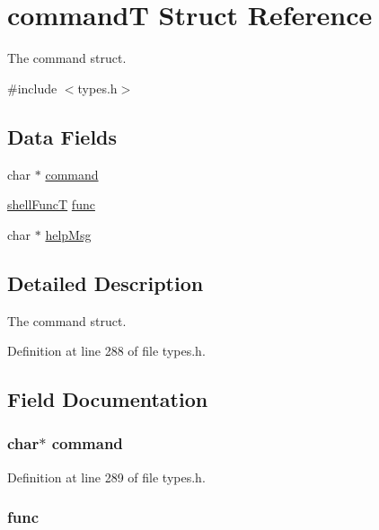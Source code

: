 \hypertarget{structcommand_t}{
\section{commandT Struct Reference}
\label{structcommand_t}
}


The command struct.  




{\ttfamily \#include $<$types.h$>$}

\subsection*{Data Fields}
\begin{DoxyCompactItemize}
\item 
char $\ast$ \hyperlink{structcommand_t_ade9cba72805fe52685a1deea307a8e82}{command}
\item 
\hyperlink{types_8h_a4688631f0fdd9ac08d416e42573c9cf7}{shellFuncT} \hyperlink{structcommand_t_aaadded894dece7b4c2b3d51d18ada303}{func}
\item 
char $\ast$ \hyperlink{structcommand_t_aecae62b0d3cecad6022e749f64cc8a8e}{helpMsg}
\end{DoxyCompactItemize}


\subsection{Detailed Description}
The command struct. 

Definition at line 288 of file types.h.



\subsection{Field Documentation}
\hypertarget{structcommand_t_ade9cba72805fe52685a1deea307a8e82}{
\subsubsection[{command}]{\setlength{\rightskip}{0pt plus 5cm}char$\ast$ {\bf command}}}
\label{structcommand_t_ade9cba72805fe52685a1deea307a8e82}


Definition at line 289 of file types.h.

\hypertarget{structcommand_t_aaadded894dece7b4c2b3d51d18ada303}{
\subsubsection[{func}]{ {\bf func}}}
\label{structcommand_t_aaadded894dece7b4c2b3d51d18ada303}


